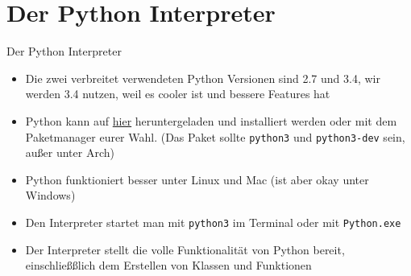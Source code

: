 \section{Der Python Interpreter}
\begin{frame}{Der Python Interpreter}
	\begin{itemize}
    	\item Die zwei verbreitet verwendeten Python Versionen sind 2.7 und 3.4, wir werden 3.4 nutzen, weil es cooler ist und bessere Features hat
		\item Python kann auf \href{http://www.python.org}{hier} heruntergeladen und installiert werden oder mit dem Paketmanager eurer Wahl. (Das Paket sollte \texttt{python3} und \texttt{python3-dev} sein, au\ss{}er unter Arch)
    	\item Python funktioniert besser unter Linux und Mac (ist aber okay unter Windows)
    	\item Den Interpreter startet man mit \texttt{python3} im Terminal oder mit \texttt{Python.exe}
    	\item Der Interpreter stellt die volle Funktionalität von Python bereit, einschließ\ss{}lich dem Erstellen von Klassen und Funktionen
	\end{itemize}
\end{frame}

